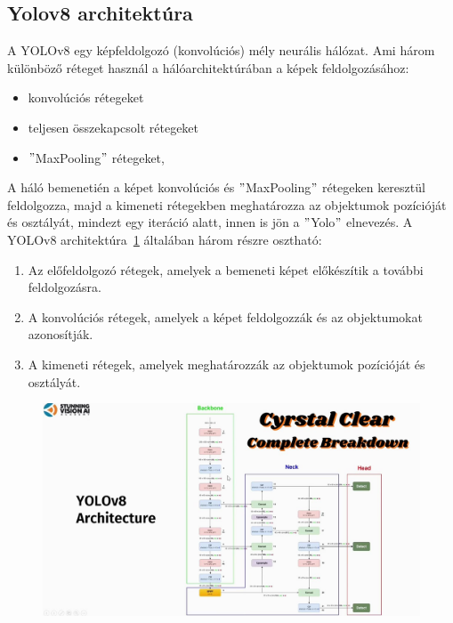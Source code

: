 \documentclass[12pt,oneside,a4paper]{article}
\theoremstyle{remark}
\begin{document}
\subsection{Yolov8 architektúra}\label{subsec:yolov8-architektura}
    A YOLOv8 egy képfeldolgozó (konvolúciós) mély neurális hálózat.
    Ami három különböző réteget használ a hálóarchitektúrában a képek feldolgozásához:
    \begin{itemize}
        \item konvolúciós rétegeket
        \item teljesen összekapcsolt rétegeket
        \item \("\)MaxPooling\("\) rétegeket,
    \end{itemize}

    A háló bemenetién a képet  konvolúciós és \("\)MaxPooling\("\) rétegeken keresztül feldolgozza,
    majd a kimeneti rétegekben meghatározza az objektumok pozícióját és osztályát, mindezt egy iteráció alatt,
    innen is jön a \("\)\gls{Yolo}\("\) elnevezés.
    A YOLOv8 architektúra~\ref{fig:Yolov8} általában három részre osztható:
    \begin{enumerate}
        \item Az előfeldolgozó rétegek, amelyek a bemeneti képet előkészítik a további feldolgozásra.
        \item A konvolúciós rétegek, amelyek a képet feldolgozzák és az objektumokat azonosítják.
        \item A kimeneti rétegek, amelyek meghatározzák az objektumok pozícióját és osztályát.
    \end{enumerate}
    \newpage
    \begin{figure}[ht]
        \centering
        \noindent\includegraphics[width=1\linewidth]{maxresdefault}
        \label{fig:Yolov8}
    \end{figure}
\end{document}
